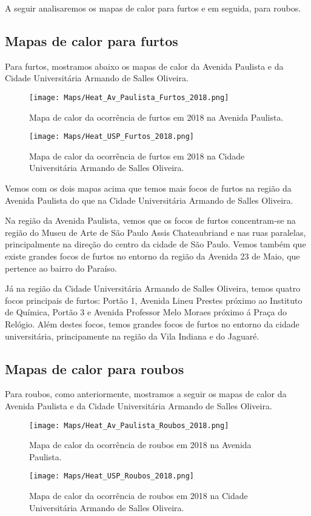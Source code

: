 \documentclass[
	12pt,
	openright,			%
	twoside,			%
	a4paper,			%
	chapter=TITLE,		%
	section=TITLE,		%
	subsection=TITLE,	%
	subsubsection=TITLE,%
	english,			%
	french,				%
	spanish,			%
	brazil				%
	]{abntex2}
\begin{document}
A seguir analisaremos os mapas de calor para furtos e em seguida, para roubos.

\subsection{Mapas de calor para furtos}
Para furtos, mostramos abaixo os mapas de calor da Avenida Paulista e da Cidade Universitária Armando de Salles Oliveira.

\begin{figure}[!htbp]
\centering
\texttt{[image: Maps/Heat\_Av\_Paulista\_Furtos\_2018.png]}
\caption{Mapa de calor da ocorrência de furtos em 2018 na Avenida Paulista.}
\end{figure}

\begin{figure}[!htbp]
\centering
\texttt{[image: Maps/Heat\_USP\_Furtos\_2018.png]}
\caption{Mapa de calor da ocorrência de furtos em 2018 na Cidade Universitária Armando de Salles Oliveira.}
\end{figure}

Vemos com os dois mapas acima que temos mais focos de furtos na região da Avenida Paulista do que na Cidade Universitária Armando de Salles Oliveira.

Na região da  Avenida Paulista, vemos que os focos de furtos  concentram-se na região do Museu de Arte de São Paulo Assis Chateaubriand e nas ruas paralelas, principalmente na direção do centro da cidade de São Paulo. Vemos também que existe grandes focos de furtos no entorno da região da Avenida 23 de Maio, que pertence ao bairro do Paraíso.

Já na região da Cidade Universitária Armando de Salles Oliveira, temos quatro focos principais de furtos: Portão 1, Avenida Lineu Prestes próximo ao Instituto de Química, Portão 3 e Avenida Professor Melo Moraes próximo á Praça do Relógio. Além destes focos, temos grandes focos de furtos no entorno da cidade universitária, principamente na região da Vila Indiana e do Jaguaré.

\subsection{Mapas de calor para roubos}
Para roubos, como anteriormente, mostramos a seguir os mapas de calor da Avenida Paulista e da Cidade Universitária Armando de Salles Oliveira.

\begin{figure}[!htbp]
\centering
\texttt{[image: Maps/Heat\_Av\_Paulista\_Roubos\_2018.png]}
\caption{Mapa de calor da ocorrência de roubos em 2018 na Avenida Paulista.}
\end{figure}
\newpage
\begin{figure}[!htbp]
\centering
\texttt{[image: Maps/Heat\_USP\_Roubos\_2018.png]}
\caption{Mapa de calor da ocorrência de roubos em 2018 na Cidade Universitária Armando de Salles Oliveira.}
\end{figure}
\end{document}
